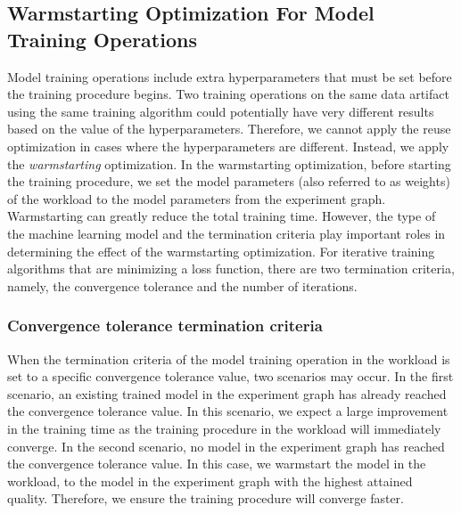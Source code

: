 
\subsection{Warmstarting Optimization For Model Training Operations}
Model training operations include extra hyperparameters that must be set before the training procedure begins.
Two training operations on the same data artifact using the same training algorithm could potentially have very different results based on the value of the hyperparameters.
Therefore, we cannot apply the reuse optimization in cases where the hyperparameters are different.
Instead, we apply the \textit{warmstarting} optimization.
In the warmstarting optimization, before starting the training procedure, we set the model parameters (also referred to as weights) of the workload to the model parameters from the experiment graph.
Warmstarting can greatly reduce the total training time.
However, the type of the machine learning model and the termination criteria play important roles in determining the effect of the warmstarting optimization.
For iterative training algorithms that are minimizing a loss function, there are two termination criteria, namely, the convergence tolerance and the number of iterations.

\subsubsection{Convergence tolerance termination criteria}
When the termination criteria of the model training operation in the workload is set to a specific convergence tolerance value, two scenarios may occur.
In the first scenario, an existing trained model in the experiment graph has already reached the convergence tolerance value.
In this scenario, we expect a large improvement in the training time as the training procedure in the workload will immediately converge.
In the second scenario, no model in the experiment graph has reached the convergence tolerance value.
In this case, we warmstart the model in the workload, to the model in the experiment graph with the highest attained quality.
Therefore, we ensure the training procedure will converge faster.

